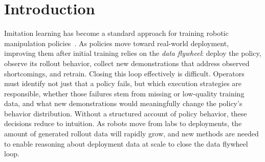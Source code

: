 \documentclass[letterpaper, 10 pt, conference]{ieeeconf}
\begin{document}
\begin{abstract}
Data flywheels promise continuous improvement via insights from deployment data. However, robot deployments create large volumes of high-dimensional rollout data that is difficult to interpret and thus extract actionable insights from. To facilitate data flywheels for robotic manipulation, we propose behavior graphs, which compress policy rollouts into a single interpretable, directed graph. We construct the graphs by identifying similar behavior modes across rollouts, connecting the behaviors temporally, and finally linking them to outcomes. In a user study on three real-world tasks, 16 of 18 participants preferred behavior graphs to browsing rollout videos, reaching comparable conclusions with 40.3\% lower perceived temporal demand and 37.6\% lower effort. Beyond facilitating interpretability for deployment data, behavior graphs are capable progress predictors: across 43 rollout collections they raise value-order correlation from 0.769 to 0.945 and halve the mean absolute error of the strongest baseline. As the number of deployed robots grows, behavior graphs introduce the structure needed to interpret and reason about deployment data at scale. We open-source our code, data, and an interactive website demo at \href{https://try.behavior-graphs.com}{try.behavior-graphs.com}.
\end{abstract}


\section{Introduction}

Imitation learning has become a standard approach for training robotic manipulation policies~\cite{chi_diffusion_2023,zhao_learning_2023}. As policies move toward real-world deployment, improving them after initial training relies on the \emph{data flywheel}: deploy the policy, observe its rollout behavior, collect new demonstrations that address observed shortcomings, and retrain. Closing this loop effectively is difficult. Operators must identify not just that a policy fails, but which execution strategies are responsible, whether those failures stem from missing or low-quality training data, and what new demonstrations would meaningfully change the policy's behavior distribution. Without a structured account of policy behavior, these decisions reduce to intuition. As robots move from labs to deployments, the amount of generated rollout data will rapidly grow, and new methods are needed to enable reasoning about deployment data at scale to close the data flywheel loop.
\end{document}
